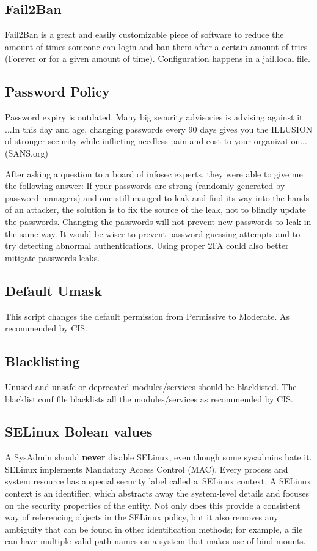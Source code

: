 \subsection{Fail2Ban}
Fail2Ban is a great and easily customizable piece of software to reduce the amount of times someone can login and ban them after a certain amount of tries (Forever or for a given amount of time). Configuration happens in a jail.local file. 

\subsection{Password Policy}

Password expiry is outdated. Many big security advisories is advising against it: ...In this day and age, changing passwords every 90 days gives you the ILLUSION of stronger security while inflicting needless pain and cost to your organization... (SANS.org)

After asking a question to a board of infosec experts, they were able to give me the following answer:
If your passwords are strong (randomly generated by password managers) and one still manged to leak and find its way into the hands of an attacker, the solution is to fix the source of the leak, not to blindly update the passwords. Changing the passwords will not prevent new passwords to leak in the same way. It would be wiser to prevent password guessing attempts and to try detecting abnormal authentications. Using proper 2FA could also better mitigate passwords leaks.


\subsection{Default Umask}
This script changes the default permission from Permissive to Moderate. As recommended by CIS. 

\subsection{Blacklisting}
Unused and unsafe or deprecated modules/services should be blacklisted. The blacklist.conf file blacklists all the modules/services as recommended by CIS.


\subsection{SELinux Bolean values}
A SysAdmin should \textbf{never} disable SELinux, even though some sysadmins hate it. 
SELinux implements Mandatory Access Control (MAC). Every process and system resource has a special security label called a SELinux context. A SELinux context is an identifier, which abstracts away the system-level details and focuses on the security properties of the entity. Not only does this provide a consistent way of referencing objects in the SELinux policy, but it also removes any ambiguity that can be found in other identification methods; for example, a file can have multiple valid path names on a system that makes use of bind mounts. 





